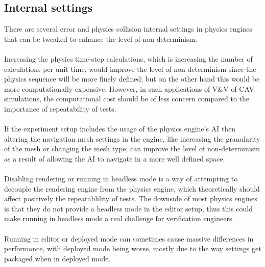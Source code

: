 \subsection{Internal settings}
\noindent There are several error and physics collision internal settings in physics engines that can be tweaked to enhance the level of non-determinism. \\\\
\noindent Increasing the physics time-step calculations, which is increasing the number of calculations per unit time, would improve the level of non-determinism since the physics sequence will be more finely defined; but on the other hand this would be more computationally expensive. However, in such applications of V\&V of CAV simulations, the computational cost should be of less concern compared to the importance of repeatability of tests. \\\\
\noindent If the experiment setup includes the usage of the physics engine's AI then altering the navigation mesh settings in the engine, like increasing the granularity of the mesh or changing the mesh type; can improve the level of non-determinism as a result of allowing the AI to navigate in a more well defined space.  \\\\
\noindent Disabling rendering or running in headless mode is a way of attempting to decouple the rendering engine from the physics engine, which theoretically should affect positively the repeatablility of tests. 
The downside of most physics engines is that they do not provide a headless mode in the editor setup, thus this could make running in headless mode a real challenge for verification engineers.  \\\\
\noindent Running in editor or deployed mode can sometimes cause massive differences in performance, with deployed mode being worse, mostly due to the way settings get packaged when in deployed mode.


